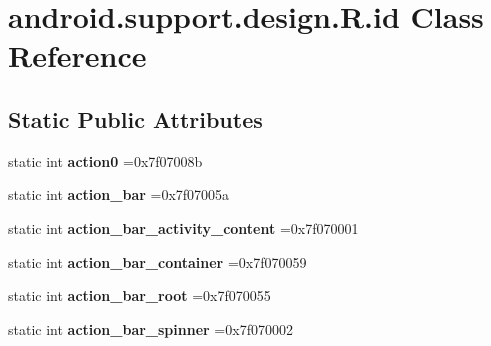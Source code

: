 \hypertarget{classandroid_1_1support_1_1design_1_1R_1_1id}{}\section{android.\+support.\+design.\+R.\+id Class Reference}
\label{classandroid_1_1support_1_1design_1_1R_1_1id}
\subsection*{Static Public Attributes}
\begin{DoxyCompactItemize}
\item 
\mbox{\label{classandroid_1_1support_1_1design_1_1R_1_1id_a3ae53bc8b4c8ecbb0dddfa3ced71340d}} 
static int {\bfseries action0} =0x7f07008b
\item 
\mbox{\label{classandroid_1_1support_1_1design_1_1R_1_1id_a1f2b7e254166086e4be4e5f64d9f02ae}} 
static int {\bfseries action\+\_\+bar} =0x7f07005a
\item 
\mbox{\label{classandroid_1_1support_1_1design_1_1R_1_1id_a8085839dbf0d810b848775c6730881a7}} 
static int {\bfseries action\+\_\+bar\+\_\+activity\+\_\+content} =0x7f070001
\item 
\mbox{\label{classandroid_1_1support_1_1design_1_1R_1_1id_ae030ab49caac2735091abc0c4cd05178}} 
static int {\bfseries action\+\_\+bar\+\_\+container} =0x7f070059
\item 
\mbox{\label{classandroid_1_1support_1_1design_1_1R_1_1id_a9831361316016fb3f8e77d96318dd841}} 
static int {\bfseries action\+\_\+bar\+\_\+root} =0x7f070055
\item 
\mbox{\label{classandroid_1_1support_1_1design_1_1R_1_1id_a58f8c6766978f205affd579e09b8b086}} 
static int {\bfseries action\+\_\+bar\+\_\+spinner} =0x7f070002
\item 
\mbox{\label{classandroid_1_1support_1_1design_1_1R_1_1id_a4f4889cf96a6b97c5257462d835686d9}} 

\end{DoxyCompactItemize}
